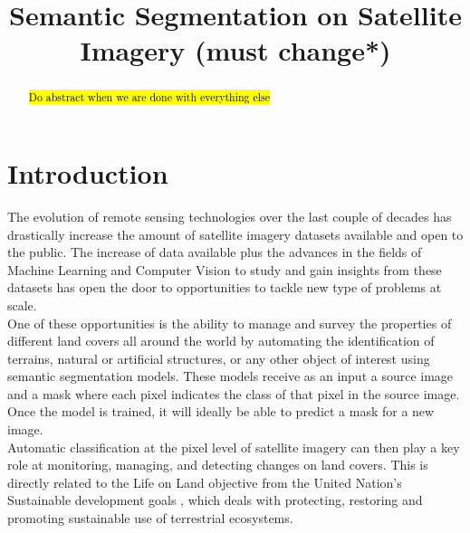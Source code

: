 \documentclass[conference]{IEEEtran}
\begin{document}
\title{Semantic Segmentation on Satellite Imagery (must change*)\\}
\author{
\and
{}
\and
{}
}
\maketitle

\begin{abstract}
\hl{Do abstract when we are done with everything else}
\end{abstract}

\section{Introduction}
The evolution of remote sensing technologies over the last couple of decades has drastically increase the amount of satellite imagery datasets available and open to the public. The increase of data available plus the advances in the fields of Machine Learning and Computer Vision to study and gain insights from these datasets has open the door to opportunities to tackle new type of problems at scale. \\ \indent
One of these opportunities is the ability to manage and survey the properties of different land covers all around the world by automating the identification of terrains, natural or artificial structures, or any other object of interest using semantic segmentation models. These models receive as an input a source image and a mask where each pixel indicates the class of that pixel in the source image. Once the model is trained, it will ideally be able to predict a mask for a new image.  \\ \indent
Automatic classification at the pixel level of satellite imagery can then play a key role at monitoring, managing, and detecting changes on land covers. This is directly related to the Life on Land objective from the United Nation's Sustainable development goals  \cite{united_nations}, which deals with protecting, restoring and promoting sustainable use of terrestrial ecosystems. 
\end{document}
